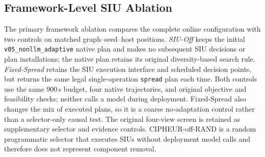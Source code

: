 \subsection{Framework-Level SIU Ablation}
The primary framework ablation compares the complete online configuration
with two controls on matched graph--seed--host positions. \emph{SIU-Off}
keeps the initial \texttt{v05\_nonllm\_adaptive} native plan and makes no
subsequent SIU decisions or plan installations; the native plan retains
its original diversity-based search rule. \emph{Fixed-Spread}
retains the SIU execution interface and scheduled decision points, but
returns the same legal single-operation \texttt{spread} plan each time.
Both controls use the same 900\,s budget, four native trajectories, and
original objective and feasibility checks; neither calls a model during
deployment. Fixed-Spread also changes the mix of executed plans, so it is
a coarse no-adaptation control rather than a selector-only causal test.
The original four-view screen is retained as supplementary
selector and evidence controls. CIPHEUR-off-RAND is a random
programmatic selector that executes SIUs without deployment model calls
and therefore does not represent component removal.
